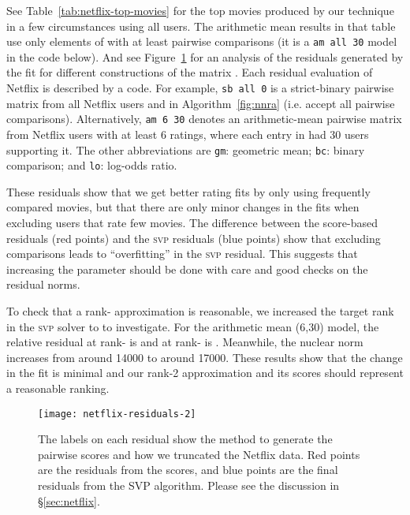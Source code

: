 \documentclass{sig-alternate}
\newcommand{\algo}[1]{\textsc{\lowercase{#1}}}
\begin{document}
\begin{center}
\begin{minipage}{\linewidth}
\begin{minipage}{\linewidth}
\begin{minipage}{\linewidth}
\begin{minipage}{\linewidth}
See Table~\ref{tab:netflix-top-movies}
for the top movies produced by our technique in a few circumstances
using all users.  The arithmetic mean results in that table
use only elements of  with at least  pairwise comparisons
(it is a \texttt{am all 30} model in the code below).
And see Figure~\ref{fig:netflix-residuals} for an analysis
of the residuals generated by the fit for different constructions
of the matrix .  
Each residual evaluation of Netflix is described by a code.
For example, \texttt{sb all 0} is a strict-binary pairwise
matrix  from all Netflix users and  in Algorithm~\ref{fig:nnra}
(i.e. accept all pairwise comparisons).  Alternatively,
\texttt{am 6 30} denotes an arithmetic-mean pairwise matrix 
from Netflix users with at least 6 ratings, where each entry in 
had 30 users supporting it.  The other abbreviations are
\texttt{gm}: geometric mean; \texttt{bc}: binary comparison; and
\texttt{lo}: log-odds ratio.

These residuals show that we get better rating
fits by only using frequently compared movies, but that there 
are only minor changes in the fits when excluding users that
rate few movies.  The difference between
the score-based residuals  (red points) and the \algo{svp} residuals 
 (blue points) show that 
excluding comparisons leads to ``overfitting'' 
in the \algo{svp} residual.  This suggests that increasing
the parameter  should be done with care and good
checks on the residual norms.

\enlargethispage{\baselineskip}
To check that a rank- approximation is reasonable,
we increased the target rank in the \algo{svp} solver
to  to investigate.  For the arithmetic mean (6,30) 
model, the relative residual at rank- is  and
at rank- is .  Meanwhile, the nuclear
norm increases from around 14000 to around 17000.
These results show that the change in the fit is minimal
and our rank-2 approximation and its scores
should represent a reasonable ranking.

 \begin{figure}[t]
  \centering
  \texttt{[image: netflix-residuals-2]}
  \caption{The labels on each residual show the method to generate
   the pairwise scores and how we truncated the Netflix data. 
	 Red points are the residuals from the scores, and blue 
	 points are the final residuals from the SVP algorithm.
	 Please see the discussion in \S\ref{sec:netflix}.} 
   \label{fig:netflix-residuals}
	 \vspace{-\baselineskip}
 \end{figure}


\end{minipage}
\end{minipage}
\end{minipage}
\end{minipage}
\end{center}
\end{document}
